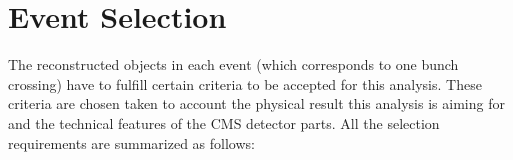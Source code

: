 % 
% 
% 
% 

\section{Event Selection}

The reconstructed objects in each event (which corresponds to one bunch crossing) have to fulfill certain criteria to be accepted for this analysis. These 
criteria are chosen taken to account the physical result this analysis is aiming for and the technical features of the CMS detector parts.
All the selection requirements are summarized as follows:

